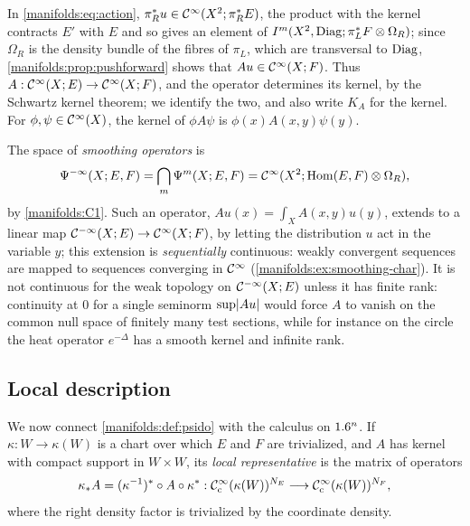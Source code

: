 In \eqref{manifolds:eq:action}, $\pi_R^*u\in\mathcal{C}^\infty(X^2;\pi_R^*E)$, the product with
the kernel contracts $E'$ with $E$ and so gives an element of
$I^{m}(X^2,\operatorname{Diag};\pi_L^*F\otimes\Omega_R)$; since $\Omega_R$ is the density bundle
of the fibres of $\pi_L$, which are transversal to $\operatorname{Diag}$,
\cref{manifolds:prop:pushforward} shows that $Au\in\mathcal{C}^\infty(X;F)$. Thus
$A:\mathcal{C}^\infty(X;E)\to\mathcal{C}^\infty(X;F)$, and the operator determines its kernel, by the Schwartz
kernel theorem; we identify the two, and also write $K_A$ for the kernel. For
$\phi,\psi\in\mathcal{C}^\infty(X)$, the kernel of $\phi A\psi$ is $\phi(x)A(x,y)\psi(y)$.

The space of \emph{smoothing operators} is
\begin{equation}\label{manifolds:eq:smoothing}
\Psi^{-\infty}(X;E,F)=\bigcap_m\Psi^{m}(X;E,F)=\mathcal{C}^\infty(X^2;\operatorname{Hom}(E,F)\otimes\Omega_R),
\end{equation}
by \ref{manifolds:C1}. Such an operator, $Au(x)=\int_XA(x,y)u(y)$, extends to a
linear map $\mathcal{C}^{-\infty}(X;E)\to\mathcal{C}^\infty(X;F)$, by letting the distribution $u$ act in
the variable $y$; this extension is \emph{sequentially} continuous: weakly convergent
sequences are mapped to sequences converging in $\mathcal{C}^\infty$
(\cref{manifolds:ex:smoothing-char}). It is not continuous for the weak topology on
$\mathcal{C}^{-\infty}(X;E)$ unless it has finite rank: continuity at $0$ for a single seminorm
$\sup\lvert Au\rvert$ would force $A$ to vanish on the common null space of finitely many test
sections, while for instance on the circle the heat operator $e^{-\Delta}$ has a smooth
kernel and infinite rank.

\subsection{Local description}
We now connect \cref{manifolds:def:psido} with the calculus on $1.6^n$. If
$\kappa:W\to\kappa(W)$ is a chart over which $E$ and $F$ are trivialized, and $A$
has kernel with compact support in $W\times W$, its \emph{local representative}
is the matrix of operators
\begin{equation*}
\kappa_*A=(\kappa^{-1})^*\circ A\circ\kappa^*:\mathcal{C}^\infty_{\mathrm{c}}(\kappa(W))^{N_E}\longrightarrow\mathcal{C}^\infty_{\mathrm{c}}(\kappa(W))^{N_F},
\end{equation*}
where the right density factor is trivialized by the coordinate density.

